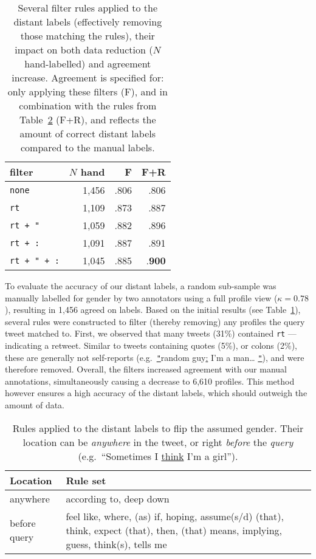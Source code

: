 \documentclass[11pt,letterpaper]{article}
\begin{document}
\begin{table}
	\centering
	\begin{tabular}{|p{3cm}|r|rr|}
		\hline
		\textbf{filter}  & \textbf{$N$ hand} & \textbf{F} & \textbf{F+R}  \\
		\hline
		{\tt none}       & 1,456             & .806       & .806          \\
		{\tt rt}         & 1,109             & .873       & .887          \\
		{\tt rt + "}     & 1,059             & .882       & .896          \\
		{\tt rt + :}     & 1,091             & .887       & .891          \\
		{\tt rt + " + :} & 1,045             & .885       & .\textbf{900} \\
		\hline
	\end{tabular}
	\caption{Several filter rules applied to the distant labels (effectively
		removing those matching the rules), their impact on both data
		reduction ($N$ hand-labelled) and agreement increase. Agreement is
		specified for: only
		applying these filters (F), and in combination with the rules
		from Table~\ref{tab:rul} (F+R), and reflects the amount of
	correct distant labels compared to the manual labels.}
	\label{tab:filt}
\end{table}

To evaluate the accuracy of our distant labels, a random sub-sample was manually
labelled for gender by two annotators using a full profile view ($\kappa=0.78$),
resulting in 1,456 agreed on labels. Based on the
initial results (see Table~\ref{tab:filt}), several rules were constructed
to filter (thereby removing) any profiles the query tweet matched to. First,
we observed that many tweets (31\%) contained {\tt rt} --- indicating a retweet.
Similar to tweets containing quotes (5\%), or colons (2\%), these are generally
not self-reports (e.g.\ \ul{\tt "}random guy\ul{:} I'm a man\ldots
\ul{\tt "}), and were therefore removed. Overall, the filters increased
agreement with our manual annotations, simultaneously causing a decrease to
6,610 profiles. This method however ensures a high accuracy of the distant
labels, which should outweigh the amount of data.

\begin{table}
	\centering
	\begin{tabular}{|l|p{5cm}|}
		\hline
		\textbf{Location} & \textbf{Rule set}                                      \\
		\hline
		anywhere          & according to, deep down                                \\
		before query      & feel like, where, (as) if, hoping, assume(s/d) (that),
		think, expect (that), then, (that) means,
		implying, guess, think(s), tells me \\
		\hline
	\end{tabular}
	\caption{Rules applied to the distant labels to flip the assumed gender.
		Their location can be \emph{anywhere} in the tweet, or right \emph{before}
		the \emph{query} (e.g.\ ``Sometimes I \ul{think} I'm a girl'').}
	\label{tab:rul}
\end{table}
\end{document}
